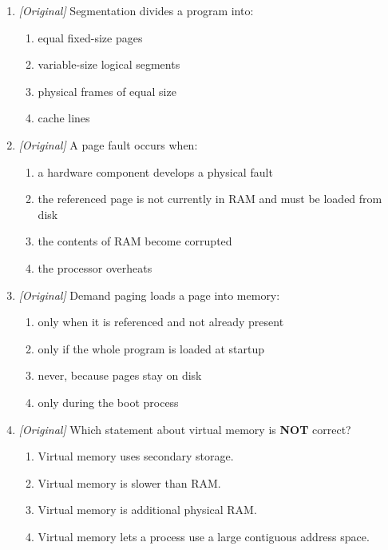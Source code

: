 \begin{enumerate}[label=\textbf{Q\arabic*.}, leftmargin=*]
\begin{enumerate}[label=\Alph*.]
      blocks.
    \item Segmentation divides memory into equal frames; paging uses
      variable-size logical units.
  \end{enumerate}
\item \textit{[Original]} Segmentation divides a program into:
  \begin{enumerate}[label=\Alph*.]
    \item equal fixed-size pages
    \item variable-size logical segments
    \item physical frames of equal size
    \item cache lines
  \end{enumerate}
\item \textit{[Original]} A page fault occurs when:
  \begin{enumerate}[label=\Alph*.]
    \item a hardware component develops a physical fault
    \item the referenced page is not currently in RAM and must be loaded from
      disk
    \item the contents of RAM become corrupted
    \item the processor overheats
  \end{enumerate}
\item \textit{[Original]} Demand paging loads a page into memory:
  \begin{enumerate}[label=\Alph*.]
    \item only when it is referenced and not already present
    \item only if the whole program is loaded at startup
    \item never, because pages stay on disk
    \item only during the boot process
  \end{enumerate}
\item \textit{[Original]} Which statement about virtual memory is \textbf{NOT}
  correct?
  \begin{enumerate}[label=\Alph*.]
    \item Virtual memory uses secondary storage.
    \item Virtual memory is slower than RAM.
    \item Virtual memory is additional physical RAM.
    \item Virtual memory lets a process use a large contiguous address space.
  \end{enumerate}

\end{enumerate}

